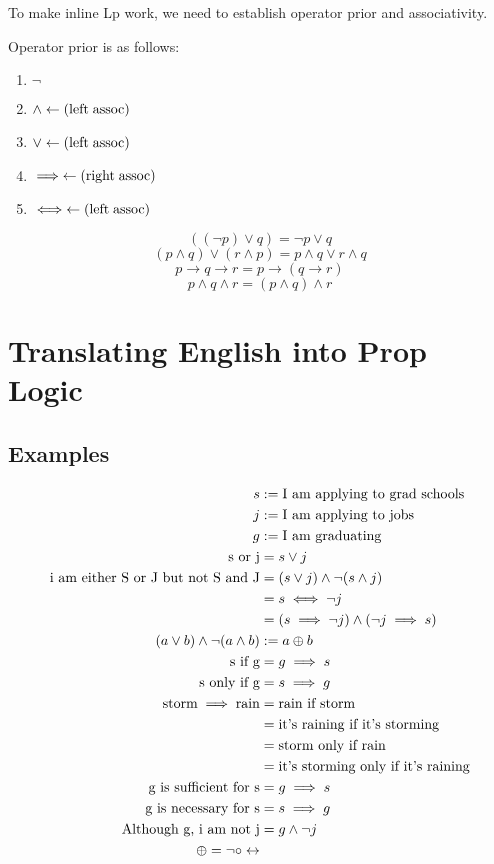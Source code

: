 \documentclass[12pt]{article}
\begin{document}
To make inline Lp work, we need to establish operator prior and associativity.
\bboxnote
\begin{nota}\label{nota:oper_prior} Operator prior is as follows:
\begin{enumerate}
  \item \(\neg\)
  \item \(\wedge\leftarrow(\mathrm{left\;assoc})\)
  \item \(\vee\leftarrow(\mathrm{left\;assoc})\)
  \item \(\implies\leftarrow(\mathrm{right\;assoc})\)
  \item \(\iff\leftarrow(\mathrm{left\;assoc})\)
\end{enumerate}
\end{nota}
\ebox
\bboxex
\[((\neg p)\vee q)=\neg p\vee q\]
\[(p\wedge q)\vee(r\wedge p)=p\wedge q\vee r\wedge q\]
\[p\to q\to r=p\to(q\to r)\]
\[p\wedge q\wedge r=(p\wedge q)\wedge r\]
\ebox

\section{Translating English into Prop Logic}

\subsection{Examples}
\bboxex
\begin{equation*}
  \begin{split}
    s&:=\text{I am applying to grad schools}\\
    j&:=\text{I am applying to jobs}\\
    g&:=\text{I am graduating}\\
    \text{s or j}&=s\vee j\\
    \text{i am either S or J but not S and J}&=(s\vee j)\wedge\neg(s\wedge j)\\
                                          &=s\iff\neg j\\
                                          &=(s\implies\neg j)\wedge(\neg j\implies s)\\
    (a\vee b)\wedge\neg(a\wedge b)&:=a\oplus b\\
    \text{s if g}&=g\implies s\\
    \text{s only if g}&=s\implies g\\
    \text{storm}\implies\text{rain}&=\text{rain if storm}\\
                             &=\text{it's raining if it's storming}\\
                             &=\text{storm only if rain}\\
                             &=\text{it's storming only if it's raining}\\
    \text{g is sufficient for s}&=g\implies s\\
    \text{g is necessary for s}&=s\implies g\\
    \text{Although g, i am not j}&=g\wedge\neg j\\
    \oplus=\neg\circ\leftrightarrow
  \end{split}
\end{equation*}
\ebox
\end{document}
